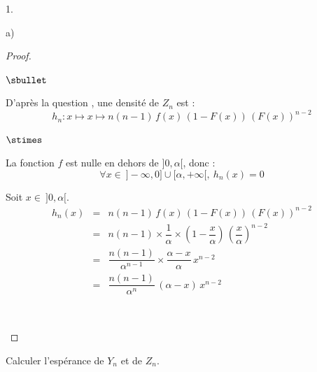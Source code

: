 \documentclass[11pt]{article}%
\begin{document}
\begin{noliste}{1.}
\begin{noliste}{a)}
\begin{proof}
\begin{noliste}{$\sbullet$}
	\conc{Finalement : $g_n : x \mapsto \left\{
	\begin{array}{cR{3cm}}
	  \dfrac{n}{\alpha^{n}} \, x^{n-1} & si $x \in \ ]0,\alpha[$
	  \nl
	  \nl[-.2cm]
	  0 & sinon
	\end{array}
	\right.$.}
	
	\item D'après la question , une densité de $Z_n$
	est :
	\[
	  h_n : x \mapsto x \mapsto n(n-1) \, f(x) \, (1-F(x)) \,
	  (F(x))^{n-2}
	\]
	\begin{noliste}{$\stimes$}
	  \item La fonction $f$ est nulle en dehors de $]0,\alpha[$, 
	  donc :
	  \[
	    \forall x \in \ ]-\infty, 0] \cup [\alpha, +\infty[, \
	    h_n(x)=0
	  \]
	  
	  
	  \newpage
	  
	  
	  \item Soit $x \in \ ]0,\alpha[$.
	  \[
	    \begin{array}{rcl}
	      h_n(x) & = & n(n-1) \, f(x) \, (1-F(x)) \, (F(x))^{n-2}
	      \\[.2cm]
	      & = & n(n-1) \times \dfrac{1}{\alpha} \times \left(1- 
	      \dfrac{x}{\alpha}
	      \right) \, \left( \dfrac{x}{\alpha}\right)^{n-2}
	      \\[.4cm]
	      & = & \dfrac{n(n-1)}{\alpha^{n-1}} \times 
	      \dfrac{\alpha - x}{\alpha} \, x^{n-2}
	      \\[.4cm]
	      & = & \dfrac{n(n-1)}{\alpha^{n}} \, (\alpha -x) \, 
	      x^{n-2}
	    \end{array}
	  \]
	\end{noliste}
	\conc{Finalement : $h_n : x \mapsto \left\{
	\begin{array}{cR{3cm}}
	  \dfrac{n(n-1)}{\alpha^{n}} \, (\alpha -x) \, x^{n-2}
	  & si $x \in \ ]0, \alpha[$
	  \nl
	  \nl[-.2cm]
	  0 & sinon
	\end{array}
	\right.$.}~\\[-1.4cm]
      \end{noliste}
    \end{proof}

    
    \item Calculer l'espérance de $Y_n$ et de $Z_n$.
  \end{noliste}
\end{noliste}
    
\end{document}
